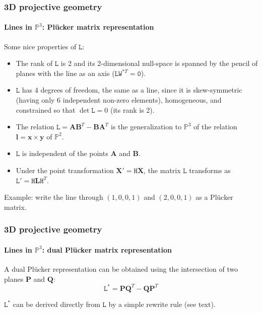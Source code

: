 \documentclass[aspectratio=169]{beamer}
\renewcommand{\vec}[1]{\boldsymbol{#1}}
\newcommand{\mat}[1]{\mathtt{#1}}
\def\Pset{\mathbb{P}}
\begin{document}
\begin{frame}
\frametitle{3D projective geometry}
\framesubtitle{Lines in $\Pset^3$: Pl\"ucker matrix representation}

Some nice properties of $\mat{L}$:
\begin{itemize}
\item The rank of $\mat{L}$ is 2 and its 2-dimensional null-space is
  spanned by the pencil of planes with the line as an axis
  ($\mat{L}\mat{W}^{*T} = \mat{0}$).
\item $\mat{L}$ has 4 degrees of freedom, the same as a line, since it
  is skew-symmetric (having only 6 independent non-zero elements),
  homogeneous, and constrained so that $\det\mat{L}=0$ (its rank is
  2).
\item The relation $\mat{L}=\vec{A}\vec{B}^T-\vec{B}\vec{A}^T$ is the
  generalization to $\Pset^3$ of the relation
  $\vec{l}=\vec{x}\times\vec{y}$ of $\Pset^2$.
\item $\mat{L}$ is independent of the points $\vec{A}$ and $\vec{B}$.
\item Under the point transformation $\vec{X}'=\mat{H}\vec{X}$, the
  matrix $\mat{L}$ transforms as $\mat{L}'=\mat{H}\vec{L}\mat{H}^T$.
\end{itemize}

\medskip

Example: write the line through $(1,0,0,1)$ and $(2,0,0,1)$ as
a Pl\"ucker matrix.

\end{frame}

\begin{frame}
\frametitle{3D projective geometry}
\framesubtitle{Lines in $\Pset^3$: dual Pl\"ucker matrix representation}

A \alert{dual} Pl\"ucker representation can be obtained using the
\alert{intersection of two planes} $\vec{P}$ and $\vec{Q}$:
\begin{equation*}
\mat{L}^* = \vec{P}\vec{Q}^T - \vec{Q}\vec{P}^T
\end{equation*}

$\mat{L}^*$ can be derived directly from $\mat{L}$ by a simple rewrite
rule (see text).

\end{frame}
\end{document}
